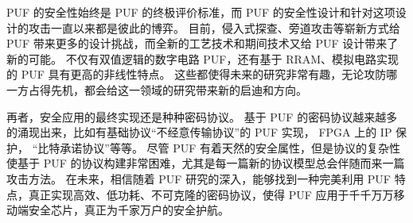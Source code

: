 PUF 的安全性始终是 PUF 的终极评价标准，而 PUF 的安全性设计和针对这项设计的攻击一直以来都是彼此的博弈。
目前，侵入式探查、旁道攻击等崭新方式给 PUF 带来更多的设计挑战，而全新的工艺技术和期间技术又给 PUF 设计带来了新的可能\supercite{delvaux2013side,merli2013localized,helfmeier2013cloning}。
不仅有双值逻辑的数字电路 PUF，还有基于 RRAM、模拟电路实现的 PUF 具有更高的非线性特点\supercite{liu2015experimental,chen2015utilizing}。
这些都使得未来的研究非常有趣，无论攻防哪一方占得先机，都会给这一领域的研究带来新的启迪和方向。

再者，安全应用的最终实现还是种种密码协议。
基于 PUF 的密码协议越来越多的涌现出来，比如有基础协议``不经意传输协议''的 PUF 实现\supercite{ruhrmair2010oblivious}， FPGA 上的 IP 保护\supercite{kumar2008butterfly}， ``比特承诺协议''\supercite{ruhrmair2013practical}等等。
尽管 PUF 有着天然的安全属性，但是协议的复杂性使基于 PUF 的协议构建非常困难，尤其是每一篇新的协议模型总会伴随而来一篇攻击方法\supercite{ruhrmair2013pufs}。
在未来，相信随着 PUF 研究的深入，能够找到一种完美利用 PUF 特点，真正实现高效、低功耗、不可克隆的密码协议，使得 PUF 应用于千千万万移动端安全芯片，真正为千家万户的安全护航。